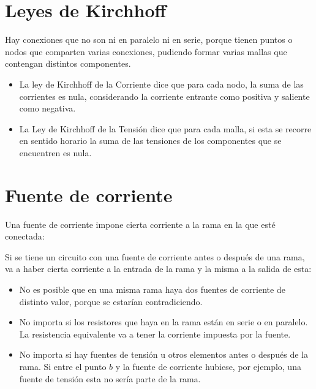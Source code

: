 \documentclass[a5paper,12pt,twoside]{book}
\begin{document}
\section{Leyes de Kirchhoff}

Hay conexiones que no son ni en paralelo ni en serie, porque tienen puntos o nodos que comparten varias conexiones, pudiendo formar varias mallas que contengan distintos componentes.

\begin{itemize}
\item La ley de Kirchhoff de la Corriente dice que para cada nodo, la suma de las corrientes es nula, considerando la corriente entrante como positiva y saliente como negativa.

\item La Ley de Kirchhoff de la Tensión dice que para cada malla, si esta se recorre en sentido horario la suma de las tensiones de los componentes que se encuentren es nula.
\end{itemize}


\section{Fuente de corriente}

Una fuente de corriente impone cierta corriente a la rama en la que esté conectada:

\begin{center}
    \def\svgwidth{0.5\linewidth}
    
\end{center}

Si se tiene un circuito con una fuente de corriente antes o después de una rama, va a haber cierta corriente a la entrada de la rama y la misma a la salida de esta:

\begin{itemize}
\item No es posible que en una misma rama haya dos fuentes de corriente de distinto valor, porque se estarían contradiciendo.

\item No importa si los resistores que haya en la rama están en serie o en paralelo. La resistencia equivalente va a tener la corriente impuesta por la fuente.

\begin{multicols}{2}
    \begin{center}
        \def\svgwidth{0.9\linewidth}
        
    \end{center}
    \begin{center}
        \def\svgwidth{0.9\linewidth}
        
    \end{center}
\end{multicols}

\item No importa si hay fuentes de tensión u otros elementos antes o después de la rama. Si entre el punto $b$ y la fuente de corriente hubiese, por ejemplo, una fuente de tensión esta no sería parte de la rama.
\end{itemize}
\end{document}
